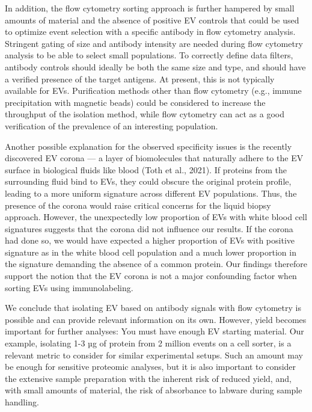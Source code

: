 \documentclass[authordate, empirical]{jote-new-article}
\begin{document}
	In addition, the flow cytometry sorting approach is further hampered by small amounts of material and the absence of positive EV controls that could be used to optimize event selection with a specific antibody in flow cytometry analysis. Stringent gating of size and antibody intensity are needed during flow cytometry analysis to be able to select small populations. To correctly define data filters, antibody controls should ideally be both the same size and type, and should have a verified presence of the target antigens. At present, this is not typically available for EVs. Purification methods other than flow cytometry (e.g., immune precipitation with magnetic beads) could be considered to increase the throughput of the isolation method, while flow cytometry can act as a good verification of the prevalence of an interesting population.



	Another possible explanation for the observed specificity issues is the recently discovered EV corona — a layer of biomolecules that naturally adhere to the EV surface in biological fluids like blood (Toth et al., 2021). If proteins from the surrounding fluid bind to EVs, they could obscure the original protein profile, leading to a more uniform signature across different EV populations. Thus, the presence of the corona would raise critical concerns for the liquid biopsy approach. However, the unexpectedly low proportion of EVs with white blood cell signatures suggests that the corona did not influence our results. If the corona had done so, we would have expected a higher proportion of EVs with positive signature as in the white blood cell population and a much lower proportion in the signature demanding the absence of a common protein. Our findings therefore support the notion that the EV corona is not a major confounding factor when sorting EVs using immunolabeling.







	We conclude that isolating EV based on antibody signals with flow cytometry is possible and can provide relevant information on its own. However, yield becomes important for further analyses: You must have enough EV starting material. Our example, isolating 1-3 µg of protein from 2 million events on a cell sorter, is a relevant metric to consider for similar experimental setups. Such an amount may be enough for sensitive proteomic analyses, but it is also important to consider the extensive sample preparation with the inherent risk of reduced yield, and, with small amounts of material, the risk of absorbance to labware during sample handling.
\end{document}
